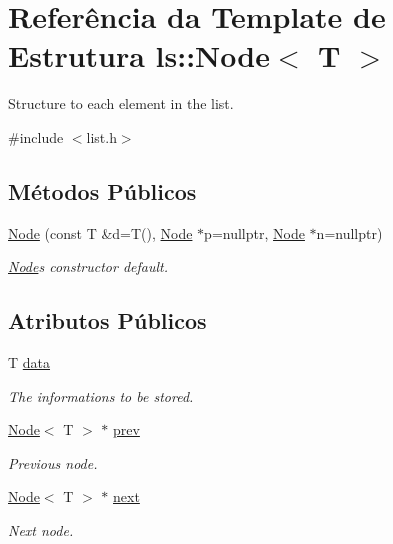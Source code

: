 \hypertarget{structls_1_1Node}{}\section{Referência da Template de Estrutura ls\+:\+:Node$<$ T $>$}
\label{structls_1_1Node}


Structure to each element in the list.  




{\ttfamily \#include $<$list.\+h$>$}

\subsection*{Métodos Públicos}
\begin{DoxyCompactItemize}
\item 
\mbox{\label{structls_1_1Node_a9d72765459432e7e6ed9d4774fde5bc9}} 
\hyperlink{structls_1_1Node_a9d72765459432e7e6ed9d4774fde5bc9}{Node} (const T \&d=T(), \hyperlink{structls_1_1Node}{Node} $\ast$p=nullptr, \hyperlink{structls_1_1Node}{Node} $\ast$n=nullptr)
\begin{DoxyCompactList}\small\item\em \hyperlink{structls_1_1Node}{Node}\textquotesingle{}s constructor default. \end{DoxyCompactList}\end{DoxyCompactItemize}
\subsection*{Atributos Públicos}
\begin{DoxyCompactItemize}
\item 
\mbox{\label{structls_1_1Node_ab1c22709e50c994125d21f1998b3b3b7}} 
T \hyperlink{structls_1_1Node_ab1c22709e50c994125d21f1998b3b3b7}{data}
\begin{DoxyCompactList}\small\item\em The informations to be stored. \end{DoxyCompactList}\item 
\mbox{\label{structls_1_1Node_a36cbf598150b7e4c7708933f78252b65}} 
\hyperlink{structls_1_1Node}{Node}$<$ T $>$ $\ast$ \hyperlink{structls_1_1Node_a36cbf598150b7e4c7708933f78252b65}{prev}
\begin{DoxyCompactList}\small\item\em Previous node. \end{DoxyCompactList}\item 
\mbox{\label{structls_1_1Node_a969a6cf64494340df3bd7136b4e7daca}} 
\hyperlink{structls_1_1Node}{Node}$<$ T $>$ $\ast$ \hyperlink{structls_1_1Node_a969a6cf64494340df3bd7136b4e7daca}{next}
\begin{DoxyCompactList}\small\item\em Next node. \end{DoxyCompactList}\end{DoxyCompactItemize}


